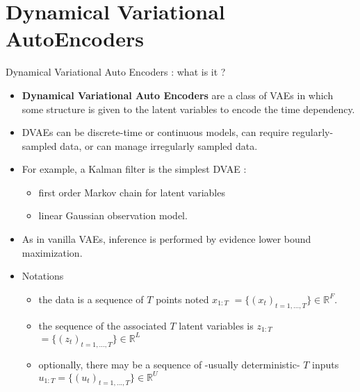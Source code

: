 \section{Dynamical Variational AutoEncoders}\label{DVAEs}

\begin{frame}{Dynamical Variational Auto Encoders : what is it ?}
    \begin{itemize}
        \item <1-> \textbf{Dynamical Variational Auto Encoders} are a class of VAEs in which some structure is given to the latent variables to encode the time dependency.
        \item <2-> DVAEs can be discrete-time or continuous models, can require regularly-sampled data, or can manage irregularly sampled data.
        \item <3-> For example, a Kalman filter is the simplest DVAE : 
        \begin{itemize}
            \item first order Markov chain for latent variables
            \item linear Gaussian observation model.
        \end{itemize}
        \item <4-> As in vanilla VAEs, inference is performed by evidence lower bound maximization.
        \item <5-> Notations
            \begin{tcolorbox}[colback=blue!5!white,colframe=black!75!black]
                \begin{itemize}
                    \item the data is a sequence of $T$ points noted \textbf{$x_{1:T}$} $= \{(x_t)_{t=1,...,T}\} \in \mathbb{R}^F$.
                    \item the sequence of the associated $T$ latent variables is \textbf{$z_{1:T}$} $= \{(z_t)_{t=1,...,T}\} \in \mathbb{R}^L$
                    \item optionally, there may be a sequence of -usually deterministic- $T$ inputs $u_{1:T} = \{(u_t)_{t=1,...,T}\} \in \mathbb{R}^U$
                \end{itemize}
            \end{tcolorbox}
    \end{itemize}
\end{frame}

